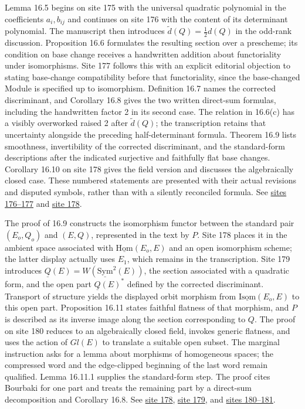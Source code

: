 Lemma 16.5 begins on site 175 with the universal quadratic polynomial in the coefficients \(a_i,b_{ij}\) and continues on site 176 with the content of its determinant polynomial. The manuscript then introduces \(\widetilde d(Q)=\tfrac12d(Q)\) in the odd-rank discussion. Proposition 16.6 formulates the resulting section over a prescheme; its condition on base change receives a handwritten addition about functoriality under isomorphisms. Site 177 follows this with an explicit editorial objection to stating base-change compatibility before that functoriality, since the base-changed Module is specified up to isomorphism. Definition 16.7 names the corrected discriminant, and Corollary 16.8 gives the two written direct-sum formulas, including the handwritten factor 2 in its second case. The relation in 16.6(c) has a visibly overworked raised 2 after \(\widetilde d(Q)\); the transcription retains that uncertainty alongside the preceding half-determinant formula. Theorem 16.9 lists smoothness, invertibility of the corrected discriminant, and the standard-form descriptions after the indicated surjective and faithfully flat base changes. Corollary 16.10 on site 178 gives the field version and discusses the algebraically closed case. These numbered statements are presented with their actual revisions and disputed symbols, rather than with a silently reconciled formula. See \href{https://grothendieck.umontpellier.fr/web/viewer.html?file=../25.pdf#page=177}{sites 176--177} and \href{https://grothendieck.umontpellier.fr/web/viewer.html?file=../25.pdf#page=179}{site 178}.

The proof of 16.9 constructs the isomorphism functor between the standard pair \((E_o,Q_o)\) and \((E,Q)\), represented in the text by \(P\). Site 178 places it in the ambient space associated with \(\underline{\mathrm{Hom}}(E_o,E)\) and an open isomorphism scheme; the latter display actually uses \(E_1\), which remains in the transcription. Site 179 introduces \(\underline Q(E)=W(\underline{\mathrm{Sym}}^2(E))\), the section associated with a quadratic form, and the open part \(\underline Q(E)^*\) defined by the corrected discriminant. Transport of structure yields the displayed orbit morphism from \(\underline{\mathrm{Isom}}(E_o,E)\) to this open part. Proposition 16.11 states faithful flatness of that morphism, and \(P\) is described as its inverse image along the section corresponding to \(Q\). The proof on site 180 reduces to an algebraically closed field, invokes generic flatness, and uses the action of \(Gl(E)\) to translate a suitable open subset. The marginal instruction asks for a lemma about morphisms of homogeneous spaces; the compressed word and the edge-clipped beginning of the last word remain qualified. Lemma 16.11.1 supplies the standard-form step. The proof cites Bourbaki for one part and treats the remaining part by a direct-sum decomposition and Corollary 16.8. See \href{https://grothendieck.umontpellier.fr/web/viewer.html?file=../25.pdf#page=179}{site 178}, \href{https://grothendieck.umontpellier.fr/web/viewer.html?file=../25.pdf#page=180}{site 179}, and \href{https://grothendieck.umontpellier.fr/web/viewer.html?file=../25.pdf#page=181}{sites 180--181}.

